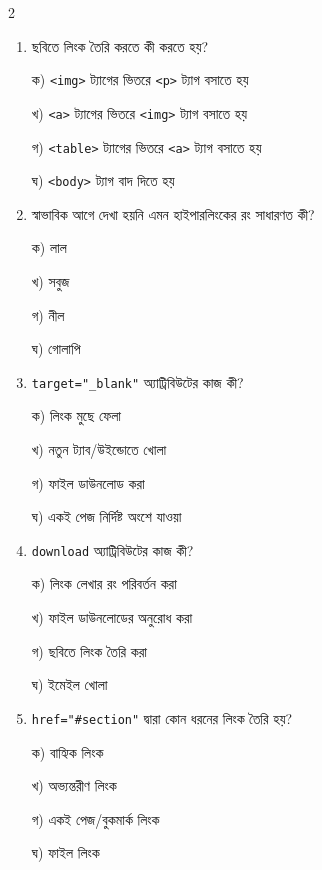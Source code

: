 \begin{multicols}{2}
\begin{enumerate}[leftmargin=*,itemsep=5pt]
\item \begin{minipage}[t]{\linewidth}\vspace{0pt}
ছবিতে লিংক তৈরি করতে কী করতে হয়?
\par ক) \texttt{<img>} ট্যাগের ভিতরে \texttt{<p>} ট্যাগ বসাতে হয়
\par খ) \texttt{<a>} ট্যাগের ভিতরে \texttt{<img>} ট্যাগ বসাতে হয়
\par গ) \texttt{<table>} ট্যাগের ভিতরে \texttt{<a>} ট্যাগ বসাতে হয়
\par ঘ) \texttt{<body>} ট্যাগ বাদ দিতে হয়
\end{minipage}

\item \begin{minipage}[t]{\linewidth}\vspace{0pt}
স্বাভাবিক আগে দেখা হয়নি এমন হাইপারলিংকের রং সাধারণত কী?
\par ক) লাল
\par খ) সবুজ
\par গ) নীল
\par ঘ) গোলাপি
\end{minipage}

\item \begin{minipage}[t]{\linewidth}\vspace{0pt}
\texttt{target="\_blank"} অ্যাট্রিবিউটের কাজ কী?
\par ক) লিংক মুছে ফেলা
\par খ) নতুন ট্যাব/উইন্ডোতে খোলা
\par গ) ফাইল ডাউনলোড করা
\par ঘ) একই পেজ নির্দিষ্ট অংশে যাওয়া
\end{minipage}

\item \begin{minipage}[t]{\linewidth}\vspace{0pt}
\texttt{download} অ্যাট্রিবিউটের কাজ কী?
\par ক) লিংক লেখার রং পরিবর্তন করা
\par খ) ফাইল ডাউনলোডের অনুরোধ করা
\par গ) ছবিতে লিংক তৈরি করা
\par ঘ) ইমেইল খোলা
\end{minipage}

\item \begin{minipage}[t]{\linewidth}\vspace{0pt}
\texttt{href="\#section"} দ্বারা কোন ধরনের লিংক তৈরি হয়?
\par ক) বাহ্যিক লিংক
\par খ) অভ্যন্তরীণ লিংক
\par গ) একই পেজ/বুকমার্ক লিংক
\par ঘ) ফাইল লিংক
\end{minipage}


\end{enumerate}
\end{multicols}

